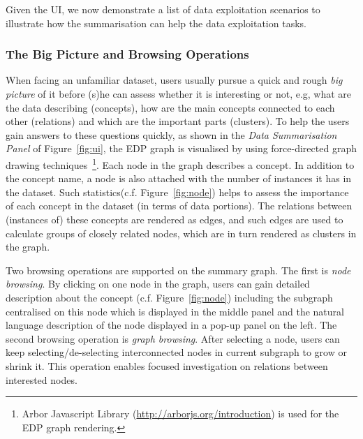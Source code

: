 Given the UI, we now demonstrate a list of data exploitation scenarios to illustrate how the summarisation can help the data exploitation tasks.

\vspace{-4ex}
\subsubsection{The Big Picture and Browsing Operations}
When facing an unfamiliar dataset, users usually pursue a quick and rough \emph{big picture} of it before (s)he can assess whether it is interesting or not, e.g, what are the data describing (concepts), how are the main concepts connected to each other (relations) and which are the important parts (clusters). To help the users gain answers to these questions quickly, as shown in the \emph{Data Summarisation Panel} of Figure~\ref{fig:ui}, the EDP graph is visualised by using force-directed graph drawing techniques~\footnote{Arbor Javascript Library (\url{http://arborjs.org/introduction}) is used for the EDP graph rendering.}. Each node in the graph describes a concept. In addition to the concept name, a node is also attached with the number of instances it has in the dataset. Such statistics(c.f. Figure~\ref{fig:node}) helps to assess the importance of each concept in the dataset (in terms of data portions). The relations between (instances of) these concepts are rendered as edges, and such edges are used to calculate groups of closely related nodes, which are in turn rendered as clusters in the graph.

Two browsing operations are supported on the summary graph. The first is \emph{node browsing}. By clicking on one node in the graph, users can gain detailed description about the concept (c.f. Figure~\ref{fig:node}) including the subgraph centralised on this node which is displayed in the middle panel and the natural language description of the node displayed in a pop-up panel on the left. The second browsing operation is \emph{graph browsing}. After selecting a node, users can keep selecting/de-selecting interconnected nodes in current subgraph to grow or shrink it. This operation enables focused investigation on relations between interested nodes.

\vspace{-3ex}
